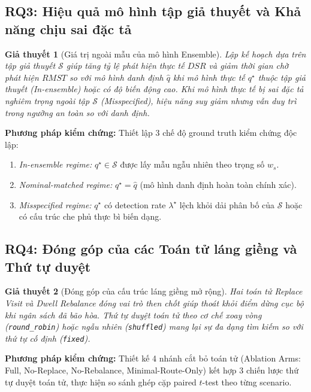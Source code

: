 \documentclass[12pt,a4paper]{article}
\newtheorem{hypothesis}{Giả thuyết}
\begin{document}
\subsection{RQ3: Hiệu quả mô hình tập giả thuyết và Khả năng chịu sai đặc tả}

\begin{hypothesis}[Giá trị ngoài mẫu của mô hình Ensemble]
Lập kế hoạch dựa trên tập giả thuyết $\mathcal{S}$ giúp tăng tỷ lệ phát hiện thực tế $DSR$ và giảm thời gian chờ phát hiện $RMST$ so với mô hình danh định $\widehat q$ khi mô hình thực tế $q^\star$ thuộc tập giả thuyết (\emph{In-ensemble}) hoặc có độ biến động cao. Khi mô hình thực tế bị sai đặc tả nghiêm trọng ngoài tập $\mathcal{S}$ (\emph{Misspecified}), hiệu năng suy giảm nhưng vẫn duy trì trong ngưỡng an toàn so với danh định.
\end{hypothesis}

\textbf{Phương pháp kiểm chứng:} Thiết lập 3 chế độ ground truth kiểm chứng độc lập:
\begin{enumerate}
    \item \emph{In-ensemble regime:} $q^\star \in \mathcal{S}$ được lấy mẫu ngẫu nhiên theo trọng số $w_s$.
    \item \emph{Nominal-matched regime:} $q^\star = \widehat q$ (mô hình danh định hoàn toàn chính xác).
    \item \emph{Misspecified regime:} $q^\star$ có detection rate $\lambda^\star$ lệch khỏi dải phân bố của $\mathcal{S}$ hoặc có cấu trúc che phủ thực bì biến dạng.
\end{enumerate}

\subsection{RQ4: Đóng góp của các Toán tử láng giềng và Thứ tự duyệt}

\begin{hypothesis}[Đóng góp của cấu trúc láng giềng mở rộng]
Hai toán tử Replace Visit và Dwell Rebalance đóng vai trò then chốt giúp thoát khỏi điểm dừng cục bộ khi ngân sách đã bão hòa. Thứ tự duyệt toán tử theo cơ chế xoay vòng (\texttt{round\_robin}) hoặc ngẫu nhiên (\texttt{shuffled}) mang lại sự đa dạng tìm kiếm so với thứ tự cố định (\texttt{fixed}).
\end{hypothesis}

\textbf{Phương pháp kiểm chứng:} Thiết kế 4 nhánh cắt bỏ toán tử (Ablation Arms: Full, No-Replace, No-Rebalance, Minimal-Route-Only) kết hợp 3 chiến lược thứ tự duyệt toán tử, thực hiện so sánh ghép cặp paired $t$-test theo từng scenario.
\end{document}
